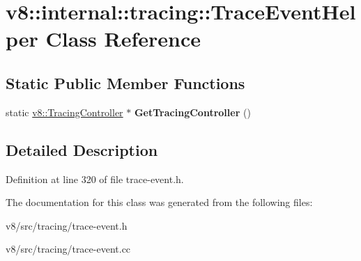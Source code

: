 \hypertarget{classv8_1_1internal_1_1tracing_1_1TraceEventHelper}{}\section{v8\+:\+:internal\+:\+:tracing\+:\+:Trace\+Event\+Helper Class Reference}
\label{classv8_1_1internal_1_1tracing_1_1TraceEventHelper}
\subsection*{Static Public Member Functions}
\begin{DoxyCompactItemize}
\item 
\mbox{\label{classv8_1_1internal_1_1tracing_1_1TraceEventHelper_a48e669c3364af398893025153693147a}} 
static \mbox{\hyperlink{classv8_1_1TracingController}{v8\+::\+Tracing\+Controller}} $\ast$ {\bfseries Get\+Tracing\+Controller} ()
\end{DoxyCompactItemize}


\subsection{Detailed Description}


Definition at line 320 of file trace-\/event.\+h.



The documentation for this class was generated from the following files\+:\begin{DoxyCompactItemize}
\item 
v8/src/tracing/trace-\/event.\+h\item 
v8/src/tracing/trace-\/event.\+cc\end{DoxyCompactItemize}
